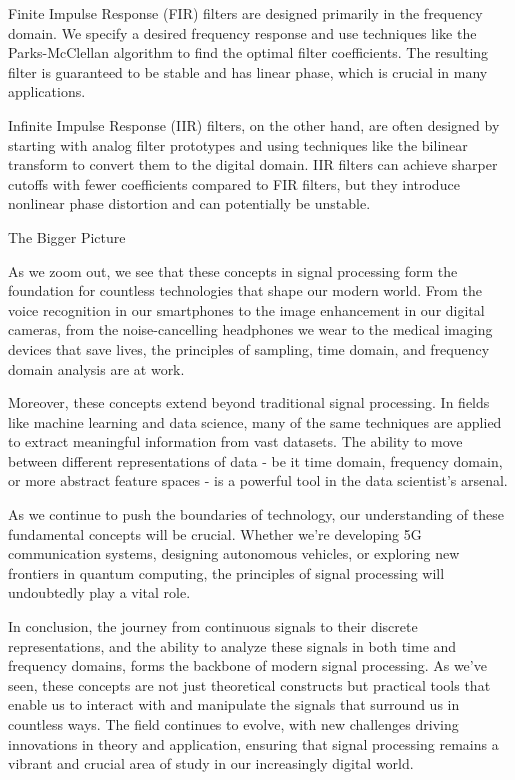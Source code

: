 Finite Impulse Response (FIR) filters are designed primarily in the frequency domain. We specify a desired frequency response and use techniques like the Parks-McClellan algorithm to find the optimal filter coefficients. The resulting filter is guaranteed to be stable and has linear phase, which is crucial in many applications.

Infinite Impulse Response (IIR) filters, on the other hand, are often designed by starting with analog filter prototypes and using techniques like the bilinear transform to convert them to the digital domain. IIR filters can achieve sharper cutoffs with fewer coefficients compared to FIR filters, but they introduce nonlinear phase distortion and can potentially be unstable.

The Bigger Picture

As we zoom out, we see that these concepts in signal processing form the foundation for countless technologies that shape our modern world. From the voice recognition in our smartphones to the image enhancement in our digital cameras, from the noise-cancelling headphones we wear to the medical imaging devices that save lives, the principles of sampling, time domain, and frequency domain analysis are at work.

Moreover, these concepts extend beyond traditional signal processing. In fields like machine learning and data science, many of the same techniques are applied to extract meaningful information from vast datasets. The ability to move between different representations of data - be it time domain, frequency domain, or more abstract feature spaces - is a powerful tool in the data scientist's arsenal.

As we continue to push the boundaries of technology, our understanding of these fundamental concepts will be crucial. Whether we're developing 5G communication systems, designing autonomous vehicles, or exploring new frontiers in quantum computing, the principles of signal processing will undoubtedly play a vital role.

In conclusion, the journey from continuous signals to their discrete representations, and the ability to analyze these signals in both time and frequency domains, forms the backbone of modern signal processing. As we've seen, these concepts are not just theoretical constructs but practical tools that enable us to interact with and manipulate the signals that surround us in countless ways. The field continues to evolve, with new challenges driving innovations in theory and application, ensuring that signal processing remains a vibrant and crucial area of study in our increasingly digital world.

